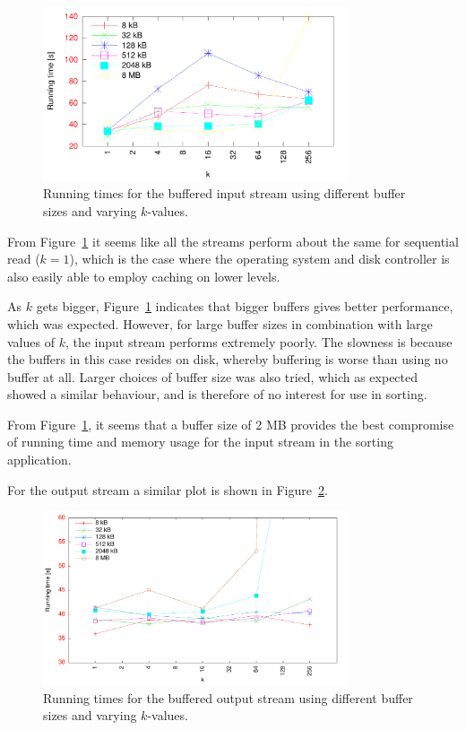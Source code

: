 \documentclass[a4paper,12pt]{article}
\begin{document}
\begin{figure}[h!]
  \centering
  \includegraphics[width=0.8\textwidth]{images/buffered_input_low}
  \caption{Running times for the buffered input stream using different
    buffer sizes and varying $k$-values.}
  \label{fig:buffered-input}
\end{figure}

From Figure~\ref{fig:buffered-input} it seems like all the streams
perform about the same for sequential read ($k = 1$), which is the
case where the operating system and disk controller is also easily
able to employ caching on lower levels.

As $k$ gets bigger, Figure~\ref{fig:buffered-input} indicates that
bigger buffers gives better performance, which was expected. However,
for large buffer sizes in combination with large values of $k$, the
input stream performs extremely poorly. The slowness is because the
buffers in this case resides on disk, whereby buffering is worse than
using no buffer at all. Larger choices of buffer size was also tried,
which as expected showed a similar behaviour, and is therefore of no
interest for use in sorting.

From Figure~\ref{fig:buffered-input}, it seems that a buffer size of 2
MB provides the best compromise of running time and memory usage for
the input stream in the sorting application.

For the output stream a similar plot is shown in
Figure~\ref{fig:buffered-output}.

\begin{figure}[h!]
  \centering
  \includegraphics[width=0.8\textwidth]{images/buffered_output_low}
  \caption{Running times for the buffered output stream using different
    buffer sizes and varying $k$-values.}
  \label{fig:buffered-output}
\end{figure}
\end{document}
